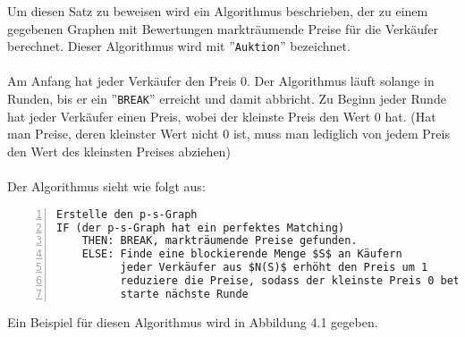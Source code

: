 \documentclass[a4paper]{scrreprt}
\theoremstyle{plain} %
\theoremstyle{definition} %
\begin{document}
\noindent
Um diesen Satz zu beweisen wird ein Algorithmus beschrieben, der zu einem gegebenen Graphen
mit Bewertungen markträumende Preise für die Verkäufer berechnet. Dieser Algorithmus wird mit ''\texttt{Auktion}''
bezeichnet.
\\
\\
Am Anfang hat jeder Verkäufer den Preis 0.
Der Algorithmus läuft solange in Runden, bis er ein ''\texttt{BREAK}'' erreicht und damit abbricht.
Zu Beginn jeder Runde hat jeder Verkäufer einen Preis, wobei der kleinste Preis den Wert 0 hat.
(Hat man Preise, deren kleinster Wert nicht 0 ist, muss man lediglich von jedem Preis
den Wert des kleinsten Preises abziehen)
\\
\\
Der Algorithmus sieht wie folgt aus:
\begin{lstlisting}[numbers=left,xleftmargin=15mm]
Erstelle den p-s-Graph
IF (der p-s-Graph hat ein perfektes Matching)
    THEN: BREAK, markträumende Preise gefunden.
    ELSE: Finde eine blockierende Menge $S$ an Käufern
          jeder Verkäufer aus $N(S)$ erhöht den Preis um 1
          reduziere die Preise, sodass der kleinste Preis 0 beträgt
          starte nächste Runde
\end{lstlisting}
\noindent
Ein Beispiel für diesen Algorithmus wird in Abbildung 4.1 gegeben.
\end{document}

